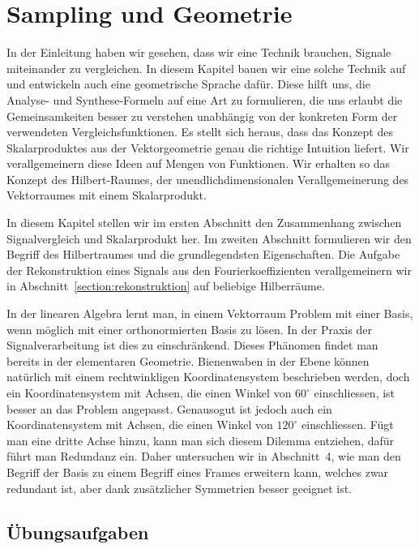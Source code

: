 %
%
%
\chapter{Sampling und Geometrie
\label{chapter:geometrie}}
In der Einleitung haben wir gesehen, dass wir eine Technik brauchen,
Signale miteinander zu vergleichen.
In diesem Kapitel bauen wir eine solche Technik auf und entwickeln
auch eine geometrische Sprache dafür.
Diese hilft uns, die Analyse- und Synthese-Formeln auf eine Art zu formulieren,
die uns erlaubt die Gemeinsamkeiten besser zu verstehen unabhängig von
der konkreten Form der verwendeten Vergleichsfunktionen.
Es stellt sich heraus, dass das Konzept des Skalarproduktes aus der
Vektorgeometrie genau die richtige Intuition liefert.
Wir verallgemeinern diese Ideen auf Mengen von Funktionen.
Wir erhalten so das Konzept des Hilbert-Raumes, der unendlichdimensionalen 
Verallgemeinerung des Vektorraumes mit einem Skalarprodukt.

In diesem Kapitel stellen wir im ersten Abschnitt den Zusammenhang
zwischen Signalvergleich und Skalarprodukt her.
Im zweiten Abschnitt formulieren wir den Begriff des Hilbertraumes
und die grundlegendsten Eigenschaften.
Die Aufgabe der Rekonstruktion eines Signals aus den Fourierkoeffizienten
verallgemeinern wir in Abschnitt~\ref{section:rekonstruktion} auf beliebige
Hilberräume.

In der linearen Algebra lernt man, in einem Vektorraum Problem mit einer
Basis, wenn möglich mit einer orthonormierten Basis zu lösen.
In der Praxis der Signalverarbeitung ist dies zu einschränkend.
Dieses Phänomen findet man bereits in der elementaren Geometrie.
Bienenwaben in der Ebene können natürlich mit einem rechtwinkligen
Koordinatensystem beschrieben werden, doch ein Koordinatensystem mit
Achsen, die einen Winkel von $60^\circ$ einschliessen, ist besser an
das Problem angepasst.
Genausogut ist jedoch auch ein Koordinatensystem  mit Achsen, die einen
Winkel von $120^\circ$ einschliessen.
Fügt man eine dritte Achse hinzu, kann man sich diesem Dilemma entziehen,
dafür führt man Redundanz ein.
Daher untersuchen wir in Abschnitt~4, wie man den Begriff der Basis
zu einem Begriff eines Frames erweitern kann, welches zwar redundant
ist, aber dank zusätzlicher Symmetrien besser geeignet ist.







\section*{Übungsaufgaben}






